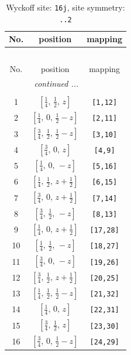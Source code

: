 \documentclass[fleqn,8pt]{jsarticle}
\begin{document}
\begin{longtable}{ccc}
\caption{Wyckoff site: {\tt 16j}, site symmetry: {\tt ..2}}
 \\
 \hline \hline
No. & position & mapping \\ \hline \endfirsthead

\multicolumn{2}{l}{\tablename\ \thetable{}} \\
 \hline \hline
No. & position & mapping \\ \hline \endhead

 \hline \hline
\multicolumn{2}{r}{\footnotesize\it continued ...} \\ \endfoot

 \hline \hline
\multicolumn{2}{r}{} \\ \endlastfoot

1 & $\left[ \frac{1}{4},\, \frac{1}{2},\, z \right]$ & {\tt [1,12]} \\ \hline
2 & $\left[ \frac{1}{4},\, 0,\, \frac{1}{2} - z \right]$ & {\tt [2,11]} \\ \hline
3 & $\left[ \frac{3}{4},\, \frac{1}{2},\, \frac{1}{2} - z \right]$ & {\tt [3,10]} \\ \hline
4 & $\left[ \frac{3}{4},\, 0,\, z \right]$ & {\tt [4,9]} \\ \hline
5 & $\left[ \frac{1}{4},\, 0,\, - z \right]$ & {\tt [5,16]} \\ \hline
6 & $\left[ \frac{1}{4},\, \frac{1}{2},\, z + \frac{1}{2} \right]$ & {\tt [6,15]} \\ \hline
7 & $\left[ \frac{3}{4},\, 0,\, z + \frac{1}{2} \right]$ & {\tt [7,14]} \\ \hline
8 & $\left[ \frac{3}{4},\, \frac{1}{2},\, - z \right]$ & {\tt [8,13]} \\ \hline
9 & $\left[ \frac{1}{4},\, 0,\, z + \frac{1}{2} \right]$ & {\tt [17,28]} \\ \hline
10 & $\left[ \frac{1}{4},\, \frac{1}{2},\, - z \right]$ & {\tt [18,27]} \\ \hline
11 & $\left[ \frac{3}{4},\, 0,\, - z \right]$ & {\tt [19,26]} \\ \hline
12 & $\left[ \frac{3}{4},\, \frac{1}{2},\, z + \frac{1}{2} \right]$ & {\tt [20,25]} \\ \hline
13 & $\left[ \frac{1}{4},\, \frac{1}{2},\, \frac{1}{2} - z \right]$ & {\tt [21,32]} \\ \hline
14 & $\left[ \frac{1}{4},\, 0,\, z \right]$ & {\tt [22,31]} \\ \hline
15 & $\left[ \frac{3}{4},\, \frac{1}{2},\, z \right]$ & {\tt [23,30]} \\ \hline
16 & $\left[ \frac{3}{4},\, 0,\, \frac{1}{2} - z \right]$ & {\tt [24,29]} \\
\end{longtable}
\end{document}
